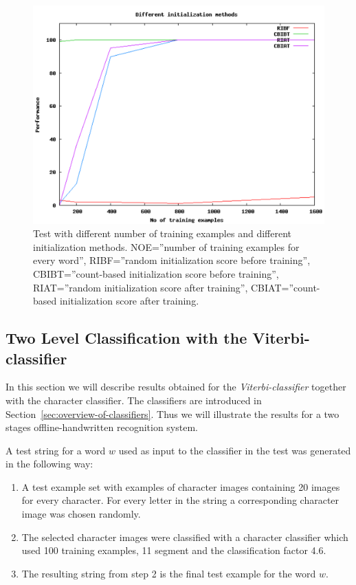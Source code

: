 \begin{figure}[h!]
\centering
\includegraphics[scale=0.57]{initialization-methods}
\caption{Test with different number of training examples and different initialization methods.
	 NOE=''number of training examples for every word'',
         RIBF=''random initialization score before training'',
         CBIBT=''count-based initialization score before training'',
         RIAT=''random initialization score after training'',
         CBIAT=''count-based initialization score after training.}
\label{figure:initialization-methods}
\end{figure}

\subsection{Two Level Classification with the Viterbi-classifier}\label{sec:result-viterbi}
In this section we will describe results obtained for the \emph{Viterbi-classifier} together with the character classifier.
The classifiers are introduced in Section~\ref{sec:overview-of-classifiers}.
Thus we will illustrate the results for a two stages offline-handwritten recognition system.

A test string for a word $w$ used as input to the classifier in the test was generated in the following way:

\begin{enumerate}
 \item A test example set with examples of character images containing 20 images for every character. 
For every letter in the string a corresponding character image was chosen randomly.
 \item The selected character images were classified with a character classifier which used 100 training examples, 11 segment and the classification factor 4.6.
 \item The resulting string from step 2 is the final test example for the word $w$.
\end{enumerate}

